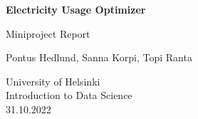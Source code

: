 \begin{titlepage}
    \begin{center}
        \vspace*{1cm}
            
        \Huge
        \textbf{Electricity Usage Optimizer}
            
        \vspace{0.5cm}
        \LARGE
        Miniproject Report
        
        \date{today}
            
        \vspace{1.5cm}
            
        Pontus Hedlund, Sanna Korpi, Topi Ranta
            
        \vfill
            

            
        \vspace{0.8cm}
            
            
        \Large
        University of Helsinki\\
        Introduction to Data Science\\
        31.10.2022\\
            
    \end{center}
\end{titlepage}